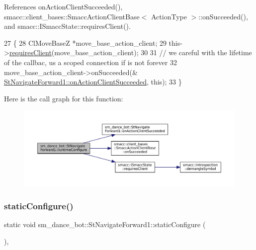 References on\+Action\+Client\+Succeeded(), smacc\+::client\+\_\+bases\+::\+Smacc\+Action\+Client\+Base$<$ Action\+Type $>$\+::on\+Succeeded(), and smacc\+::\+I\+Smacc\+State\+::requires\+Client().


\begin{DoxyCode}
27   \{
28     ClMoveBaseZ *move\_base\_action\_client;
29     this->\hyperlink{classsmacc_1_1ISmaccState_a7f95c9f0a6ea2d6f18d1aec0519de4ac}{requiresClient}(move\_base\_action\_client);
30 
31     \textcolor{comment}{// we careful with the lifetime of the callbac, us a scoped connection if is not forever}
32     move\_base\_action\_client->onSucceeded(&
      \hyperlink{structsm__dance__bot_1_1StNavigateForward1_ab5af8fd66b5c39ffef4829233d449d55}{StNavigateForward1::onActionClientSucceeded}, \textcolor{keyword}{this});
33   \}
\end{DoxyCode}
Here is the call graph for this function\+:
\nopagebreak
\begin{figure}[H]
\begin{center}
\leavevmode
\includegraphics[width=350pt]{structsm__dance__bot_1_1StNavigateForward1_a970f2128e6f29396da2a1545d4dbdc04_cgraph}
\end{center}
\end{figure}
\mbox{\label{structsm__dance__bot_1_1StNavigateForward1_a5c18e9458f6b9bd0e06f7f242e5bc2da}} 
\subsubsection{\texorpdfstring{static\+Configure()}{staticConfigure()}}
{\footnotesize\ttfamily static void sm\+\_\+dance\+\_\+bot\+::\+St\+Navigate\+Forward1\+::static\+Configure (\begin{DoxyParamCaption}{ }\end{DoxyParamCaption})\hspace{0.3cm}{\ttfamily [inline]}, {\ttfamily [static]}}




